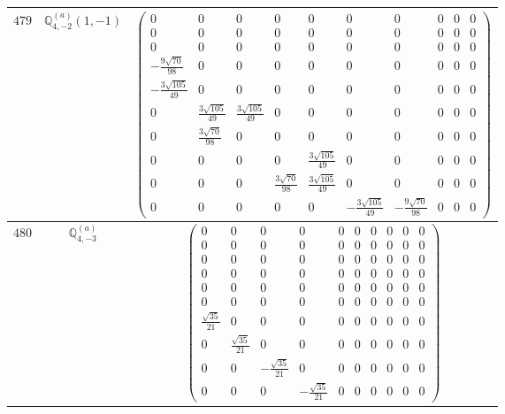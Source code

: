 \documentclass[fleqn,8pt,landscape]{jsarticle}
\begin{document}
\begin{center}
\begin{longtable}{ccc}
$ 479 $ & $ \mathbb{Q}_{4,-2}^{(a)}(1,-1) $ & $ \begin{pmatrix} 0 & 0 & 0 & 0 & 0 & 0 & 0 & 0 & 0 & 0 \\ 0 & 0 & 0 & 0 & 0 & 0 & 0 & 0 & 0 & 0 \\ 0 & 0 & 0 & 0 & 0 & 0 & 0 & 0 & 0 & 0 \\ - \frac{9 \sqrt{70}}{98} & 0 & 0 & 0 & 0 & 0 & 0 & 0 & 0 & 0 \\ - \frac{3 \sqrt{105}}{49} & 0 & 0 & 0 & 0 & 0 & 0 & 0 & 0 & 0 \\ 0 & \frac{3 \sqrt{105}}{49} & \frac{3 \sqrt{105}}{49} & 0 & 0 & 0 & 0 & 0 & 0 & 0 \\ 0 & \frac{3 \sqrt{70}}{98} & 0 & 0 & 0 & 0 & 0 & 0 & 0 & 0 \\ 0 & 0 & 0 & 0 & \frac{3 \sqrt{105}}{49} & 0 & 0 & 0 & 0 & 0 \\ 0 & 0 & 0 & \frac{3 \sqrt{70}}{98} & \frac{3 \sqrt{105}}{49} & 0 & 0 & 0 & 0 & 0 \\ 0 & 0 & 0 & 0 & 0 & - \frac{3 \sqrt{105}}{49} & - \frac{9 \sqrt{70}}{98} & 0 & 0 & 0 \end{pmatrix} $ \\ \hline
$ 480 $ & $ \mathbb{Q}_{4,-3}^{(a)} $ & $ \begin{pmatrix} 0 & 0 & 0 & 0 & 0 & 0 & 0 & 0 & 0 & 0 \\ 0 & 0 & 0 & 0 & 0 & 0 & 0 & 0 & 0 & 0 \\ 0 & 0 & 0 & 0 & 0 & 0 & 0 & 0 & 0 & 0 \\ 0 & 0 & 0 & 0 & 0 & 0 & 0 & 0 & 0 & 0 \\ 0 & 0 & 0 & 0 & 0 & 0 & 0 & 0 & 0 & 0 \\ 0 & 0 & 0 & 0 & 0 & 0 & 0 & 0 & 0 & 0 \\ \frac{\sqrt{35}}{21} & 0 & 0 & 0 & 0 & 0 & 0 & 0 & 0 & 0 \\ 0 & \frac{\sqrt{35}}{21} & 0 & 0 & 0 & 0 & 0 & 0 & 0 & 0 \\ 0 & 0 & - \frac{\sqrt{35}}{21} & 0 & 0 & 0 & 0 & 0 & 0 & 0 \\ 0 & 0 & 0 & - \frac{\sqrt{35}}{21} & 0 & 0 & 0 & 0 & 0 & 0 \end{pmatrix} $ \\ \hline

\end{longtable}
\end{center}
\end{document}
